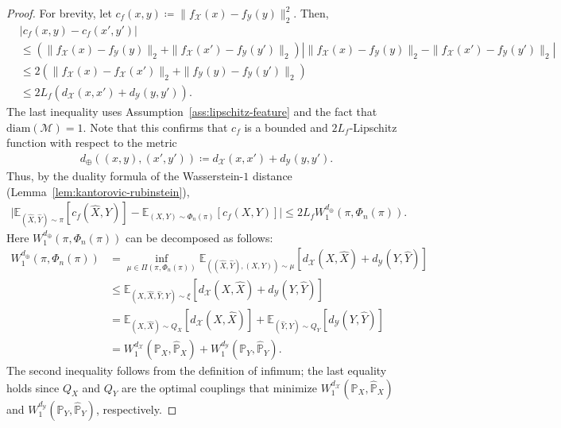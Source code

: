 \documentclass{article}
\theoremstyle{plain}
\theoremstyle{definition}
\theoremstyle{remark}
\begin{document}
\begin{proof}
	For brevity, let $c_f(x,y) \coloneqq \|f_{\mathcal{X}}(x) - f_{\mathcal{Y}}(y)\|_2^2$. Then,
	\begin{align*}
		&\left\vert c_f(x,y) - c_f(x',y') \right\vert \\
		&\leq \left(\|f_{\mathcal{X}}(x) - f_{\mathcal{Y}}(y)\|_2 + \|f_{\mathcal{X}}(x') - f_{\mathcal{Y}}(y')\|_2\right)\left\vert\|f_{\mathcal{X}}(x) - f_{\mathcal{Y}}(y)\|_2 - \|f_{\mathcal{X}}(x') - f_{\mathcal{Y}}(y')\|_2\right \vert \\
		&\leq 2\left(\|f_{\mathcal{X}}(x) - f_{\mathcal{X}}(x')\|_2 + \|f_{\mathcal{Y}}(y) - f_{\mathcal{Y}}(y')\|_2\right) \\
		&\leq 2L_f\left(d_{\mathcal{X}}(x,x') + d_{\mathcal{Y}}(y,y')\right) .
	\end{align*}
	The last inequality uses Assumption~\ref{ass:lipschitz-feature} and the fact that $\mathrm{diam}(\mathcal{M}) = 1$. Note that this confirms that $c_f$ is a bounded and $2L_f$-Lipschitz function with respect to the metric
	\begin{align*}
		d_{\oplus}((x,y),(x',y')) \coloneqq d_{\mathcal{X}}(x,x') + d_{\mathcal{Y}}(y,y') .
	\end{align*}
	Thus, by the duality formula of the Wasserstein-$1$ distance (Lemma~\ref{lem:kantorovic-rubinstein}),
	\begin{align*}
		\Big\vert \mathbb{E}_{(\hat{X},\hat{Y}) \sim \pi}[c_f(\hat{X},\hat{Y})] - \mathbb{E}_{(X,Y) \sim \Phi_n(\pi)} [c_f(X,Y)] \Big\vert \leq 2L_f W_1^{d_{\oplus}}(\pi,\Phi_n(\pi)) .
	\end{align*}
	Here $W_1^{d_{\oplus}}(\pi,\Phi_n(\pi))$ can be decomposed as follows:
	\begin{align}
		\label{eq:feature-term}
		W_1^{d_{\oplus}}(\pi,\Phi_n(\pi)) & = \inf_{\mu \in \Pi(\pi,\Phi_n(\pi))} \mathbb{E}_{((\hat{X},\hat{Y}),(X,Y)) \sim \mu} \left[d_{\mathcal{X}}(X,\hat{X}) + d_{\mathcal{Y}}(Y,\hat{Y})\right] \nonumber\\
		&\leq \mathbb{E}_{(X,\hat{X},\hat{Y},Y) \sim \xi} \left[d_{\mathcal{X}}(X,\hat{X}) + d_{\mathcal{Y}}(Y,\hat{Y})\right] \nonumber\\
		&= \mathbb{E}_{(X,\hat{X}) \sim Q_X} \left[d_{\mathcal{X}}(X,\hat{X})\right] + \mathbb{E}_{(\hat{Y},Y) \sim Q_Y} \left[d_{\mathcal{Y}}(Y,\hat{Y})\right] \nonumber\\
		&= W_1^{d_{\mathcal{X}}}(\mathbb{P}_X,\hat{\mathbb{P}}_X) + W_1^{d_{\mathcal{Y}}}(\mathbb{P}_Y,\hat{\mathbb{P}}_Y) .
	\end{align}
	The second inequality follows from the definition of infimum; the last equality holds since $Q_X$ and $Q_Y$ are the optimal couplings that minimize $W_1^{d_{\mathcal{X}}}(\mathbb{P}_X,\hat{\mathbb{P}}_X)$ and $W_1^{d_{\mathcal{Y}}}(\mathbb{P}_Y,\hat{\mathbb{P}}_Y)$, respectively.
	

\end{proof}
\end{document}
